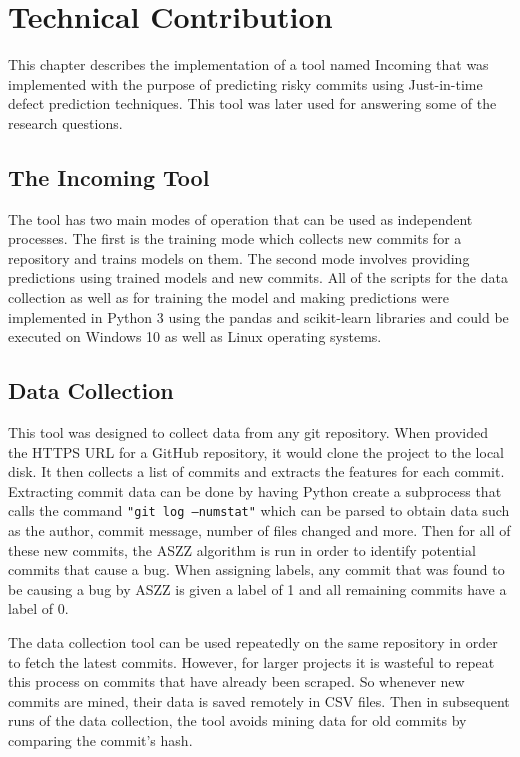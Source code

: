 \documentclass[../main.tex]{subfiles}
\begin{document}
\chapter{Technical Contribution}\label{chapter:technical_contribution}

This chapter describes the implementation of a tool named Incoming that was implemented with the purpose of predicting risky commits using Just-in-time defect prediction techniques. This tool was later used for answering some of the research questions. 

\section{The Incoming Tool}

The tool has two main modes of operation that can be used as independent processes. The first is the training mode which collects new commits for a repository and trains models on them. The second mode involves providing predictions using trained models and new commits. All of the scripts for the data collection as well as for training the model and making predictions were implemented in Python 3 using the pandas and scikit-learn libraries and could be executed on Windows 10 as well as Linux operating systems. 

\section{Data Collection}

This tool was designed to collect data from any git repository. When provided the HTTPS URL for a GitHub repository, it would clone the project to the local disk. It then collects a list of commits and extracts the features for each commit. Extracting commit data can be done by having Python create a subprocess that calls the command \texttt{"git log --numstat"} which can be parsed to obtain data such as the author, commit message, number of files changed and more. Then for all of these new commits, the ASZZ algorithm is run in order to identify potential commits that cause a bug. When assigning labels, any commit that was found to be causing a bug by ASZZ is given a label of 1 and all remaining commits have a label of 0. 

The data collection tool can be used repeatedly on the same repository in order to fetch the latest commits. However, for larger projects it is wasteful to repeat this process on commits that have already been scraped. So whenever new commits are mined, their data is saved remotely in CSV files. Then in subsequent runs of the data collection, the tool avoids mining data for old commits by comparing the commit's hash. 
\end{document}
